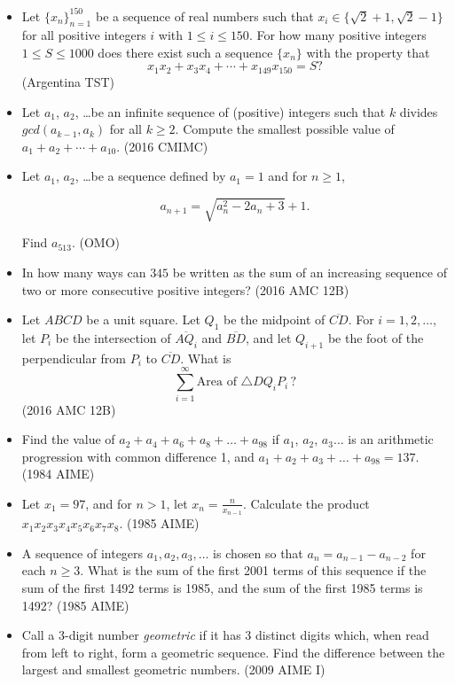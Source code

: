 \documentclass{article}
\begin{document}
\begin{itemize}
\item Let $\{x_n\}_{n=1}^{150}$ be a sequence of real numbers such that $x_i\in\{\sqrt{2}+1,\sqrt{2}-1\}$ for all positive integers $i$ with $1\le i\le 150$. For how many positive integers $1\le S\le 1000$ does there exist such a sequence $\{x_n\}$ with the property that $$x_1x_2+x_3x_4+\cdots+x_{149}x_{150}=S?$$ (Argentina TST)

\item Let $a_1$, $a_2$, \ldots be an infinite sequence of (positive) integers such that $k$ divides $gcd(a_{k-1},a_k)$ for all $k\ge 2$. Compute the smallest possible value of $a_1+a_2+\cdots+a_{10}$. (2016 CMIMC)

\item Let $a_1$, $a_2$, \ldots be a sequence defined by $a_1=1$ and for $n\ge 1$,

$$a_{n+1}=\sqrt{a_n^2-2a_n+3}+1.$$

Find $a_{513}$. (OMO)

\item In how many ways can $345$ be written as the sum of an increasing sequence of two or more consecutive positive integers? (2016 AMC 12B)


\item Let $ABCD$ be a unit square. Let $Q_1$ be the midpoint of $\overline{CD}$. For $i=1,2,\dots,$ let $P_i$ be the intersection of $\overline{AQ_i}$ and $\overline{BD}$, and let $Q_{i+1}$ be the foot of the perpendicular from $P_i$ to $\overline{CD}$. What is 
$$\sum_{i=1}^{\infty} \text{Area of } \triangle DQ_i P_i \, ?$$ (2016 AMC 12B)

\item Find the value of $a_2+a_4+a_6+a_8+\ldots+a_{98}$ if $a_1$, $a_2$, $a_3\ldots$ is an arithmetic progression with common difference 1, and $a_1+a_2+a_3+\ldots+a_{98}=137$. (1984 AIME)

\item Let $x_1=97$, and for $n>1$, let $x_n=\frac{n}{x_{n-1}}$. Calculate the product $x_1x_2x_3x_4x_5x_6x_7x_8$. (1985 AIME)

\item A sequence of integers $a_1, a_2, a_3, \ldots$ is chosen so that $a_n = a_{n - 1} - a_{n - 2}$ for each $n \ge 3$. What is the sum of the first 2001 terms of this sequence if the sum of the first 1492 terms is 1985, and the sum of the first 1985 terms is 1492? (1985 AIME)

\item Call a 3-digit number \emph{geometric} if it has 3 distinct digits which, when read from left to right, form a geometric sequence. Find the difference between the largest and smallest geometric numbers. (2009 AIME I)


\end{itemize}
\end{document}
